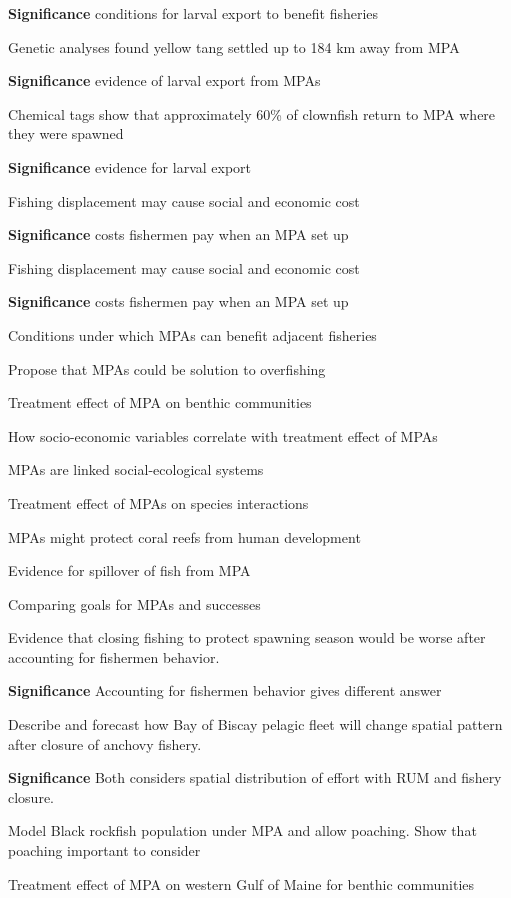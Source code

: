 \documentclass[]{article}
\begin{document}
\begin{description}
\textbf{Significance} conditions for larval export to benefit fisheries
\item[\citet{Christieetal2010}]
Genetic analyses found yellow tang settled up to 184 km away from MPA

\textbf{Significance} evidence of larval export from MPAs
\item[\citet{Almanyeatl2007}]
Chemical tags show that approximately 60\% of clownfish return to MPA
where they were spawned

\textbf{Significance} evidence for larval export
\item[\citet{Rijnsdorpetal2001}]
Fishing displacement may cause social and economic cost

\textbf{Significance} costs fishermen pay when an MPA set up
\item[\citet{Sanchiricoetal2006}]
Fishing displacement may cause social and economic cost

\textbf{Significance} costs fishermen pay when an MPA set up
\item[\citet{Hart2006}]
Conditions under which MPAs can benefit adjacent fisheries
\item[\citet{GellRoberts2003}]
Propose that MPAs could be solution to overfishing
\item[\citet{Dinmoreetal2003}]
Treatment effect of MPA on benthic communities
\item[\citet{Dawetal2011}]
How socio-economic variables correlate with treatment effect of MPAs
\item[\citet{Pollnacetal2010}]
MPAs are linked social-ecological systems
\item[\citet{Babcocketal2010}]
Treatment effect of MPAs on species interactions
\item[\citet{Cinneretal2009}]
MPAs might protect coral reefs from human development
\item[\citet{JanuchowskiHartleyetal2012}]
Evidence for spillover of fish from MPA
\item[\citet{McClanahanetal2006}]
Comparing goals for MPAs and successes
\item[\citet{Smithetal2008}]
Evidence that closing fishing to protect spawning season would be worse
after accounting for fishermen behavior.

\textbf{Significance} Accounting for fishermen behavior gives different
answer
\item[\citet{Vermardetal2008}]
Describe and forecast how Bay of Biscay pelagic fleet will change
spatial pattern after closure of anchovy fishery.

\textbf{Significance} Both considers spatial distribution of effort with
RUM and fishery closure.
\item[\citet{SethiHilborn2008}]
Model Black rockfish population under MPA and allow poaching. Show that
poaching important to consider
\item[\citet{Grizzleetal2009}]
Treatment effect of MPA on western Gulf of Maine for benthic communities
\end{description}
\end{document}
